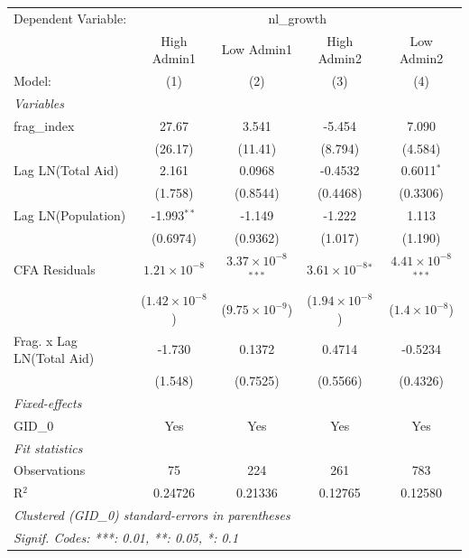 
\begingroup
\centering
\begin{tabular}{lcccc}
   \tabularnewline \midrule \midrule
   Dependent Variable: & \multicolumn{4}{c}{nl\_growth}\\
                             & High Admin1             & Low Admin1                    & High Admin2                 & Low Admin2 \\   
   Model:                    & (1)                     & (2)                           & (3)                         & (4)\\  
   \midrule
   \emph{Variables}\\
   frag\_index               & 27.67                   & 3.541                         & -5.454                      & 7.090\\   
                             & (26.17)                 & (11.41)                       & (8.794)                     & (4.584)\\   
   Lag LN(Total Aid)         & 2.161                   & 0.0968                        & -0.4532                     & 0.6011$^{*}$\\   
                             & (1.758)                 & (0.8544)                      & (0.4468)                    & (0.3306)\\   
   Lag LN(Population)        & -1.993$^{**}$           & -1.149                        & -1.222                      & 1.113\\   
                             & (0.6974)                & (0.9362)                      & (1.017)                     & (1.190)\\   
   CFA Residuals             & $1.21\times 10^{-8}$    & $3.37\times 10^{-8}$$^{***}$  & $3.61\times 10^{-8}$$^{*}$  & $4.41\times 10^{-8}$$^{***}$\\    
                             & ($1.42\times 10^{-8}$)  & ($9.75\times 10^{-9}$)        & ($1.94\times 10^{-8}$)      & ($1.4\times 10^{-8}$)\\    
   Frag. x Lag LN(Total Aid) & -1.730                  & 0.1372                        & 0.4714                      & -0.5234\\   
                             & (1.548)                 & (0.7525)                      & (0.5566)                    & (0.4326)\\   
   \midrule
   \emph{Fixed-effects}\\
   GID\_0                    & Yes                     & Yes                           & Yes                         & Yes\\  
   \midrule
   \emph{Fit statistics}\\
   Observations              & 75                      & 224                           & 261                         & 783\\  
   R$^2$                     & 0.24726                 & 0.21336                       & 0.12765                     & 0.12580\\  
   \midrule \midrule
   \multicolumn{5}{l}{\emph{Clustered (GID\_0) standard-errors in parentheses}}\\
   \multicolumn{5}{l}{\emph{Signif. Codes: ***: 0.01, **: 0.05, *: 0.1}}\\
\end{tabular}
\par\endgroup


